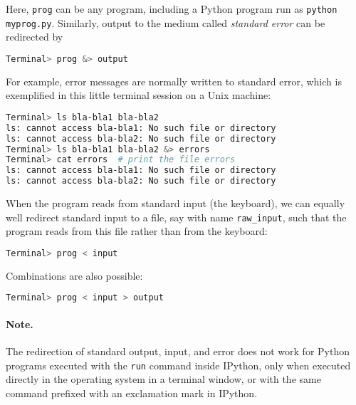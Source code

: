 \documentclass[graybox,sectrefs,envcountresetchap,open=right,final]{svmonodo}
\begin{document}
Here, \texttt{prog} can be any
program, including a Python program run as \texttt{python myprog.py}.
Similarly, output to the medium called \emph{standard error}
can be redirected by



\begin{lstlisting}[language=bash,style=simple,xleftmargin=2mm]
Terminal> prog &> output

\end{lstlisting}

For example, error messages are normally written to standard error, which
is exemplified in this little terminal session on a Unix machine:









\begin{lstlisting}[language=bash,style=simple,xleftmargin=2mm]
Terminal> ls bla-bla1 bla-bla2
ls: cannot access bla-bla1: No such file or directory
ls: cannot access bla-bla2: No such file or directory
Terminal> ls bla-bla1 bla-bla2 &> errors
Terminal> cat errors  # print the file errors
ls: cannot access bla-bla1: No such file or directory
ls: cannot access bla-bla2: No such file or directory

\end{lstlisting}

When the program reads from standard input (the keyboard),
we can equally well redirect
standard input to a file, say with name \Verb!raw_input!, such that
the program reads from this file rather than from the keyboard:



\begin{lstlisting}[language=bash,style=simple,xleftmargin=2mm]
Terminal> prog < input

\end{lstlisting}

Combinations are also possible:



\begin{lstlisting}[language=bash,style=simple,xleftmargin=2mm]
Terminal> prog < input > output

\end{lstlisting}


\paragraph{Note.}
The redirection of standard output, input, and error
does not work for Python programs executed with the \texttt{run}
command inside IPython, only when executed directly
in the operating system in a terminal window, or with the same
command prefixed with an exclamation mark in IPython.
\end{document}
